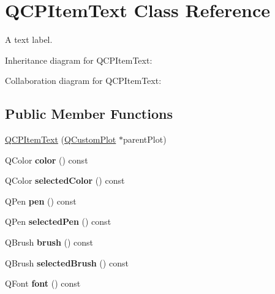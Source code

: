 \hypertarget{classQCPItemText}{}\section{Q\+C\+P\+Item\+Text Class Reference}
\label{classQCPItemText}


A text label.  




Inheritance diagram for Q\+C\+P\+Item\+Text\+:


Collaboration diagram for Q\+C\+P\+Item\+Text\+:
\subsection*{Public Member Functions}
\begin{DoxyCompactItemize}
\item 
\hyperlink{classQCPItemText_a77ff96a2972a00872ff8f8c67143abbe}{Q\+C\+P\+Item\+Text} (\hyperlink{classQCustomPlot}{Q\+Custom\+Plot} $\ast$parent\+Plot)
\item 
Q\+Color {\bfseries color} () const \hypertarget{classQCPItemText_ac9cb0a8a27f64d1b40855910ea9ebd03}{}\label{classQCPItemText_ac9cb0a8a27f64d1b40855910ea9ebd03}

\item 
Q\+Color {\bfseries selected\+Color} () const \hypertarget{classQCPItemText_a44f690ec0ba6a32e518f2e923c002e39}{}\label{classQCPItemText_a44f690ec0ba6a32e518f2e923c002e39}

\item 
Q\+Pen {\bfseries pen} () const \hypertarget{classQCPItemText_a552bd02f46dbcb4b4812559036893352}{}\label{classQCPItemText_a552bd02f46dbcb4b4812559036893352}

\item 
Q\+Pen {\bfseries selected\+Pen} () const \hypertarget{classQCPItemText_a70c86ec95133d3e904d1718023fe3c4e}{}\label{classQCPItemText_a70c86ec95133d3e904d1718023fe3c4e}

\item 
Q\+Brush {\bfseries brush} () const \hypertarget{classQCPItemText_a38b981dfacb703efa8e27346eebcb5a2}{}\label{classQCPItemText_a38b981dfacb703efa8e27346eebcb5a2}

\item 
Q\+Brush {\bfseries selected\+Brush} () const \hypertarget{classQCPItemText_ac6802bbceff1ade0053166c64a5a6966}{}\label{classQCPItemText_ac6802bbceff1ade0053166c64a5a6966}

\item 
Q\+Font {\bfseries font} () const \hypertarget{classQCPItemText_ad34943fd68a9b1451d3e3234d072e418}{}\label{classQCPItemText_ad34943fd68a9b1451d3e3234d072e418}


\end{DoxyCompactItemize}
